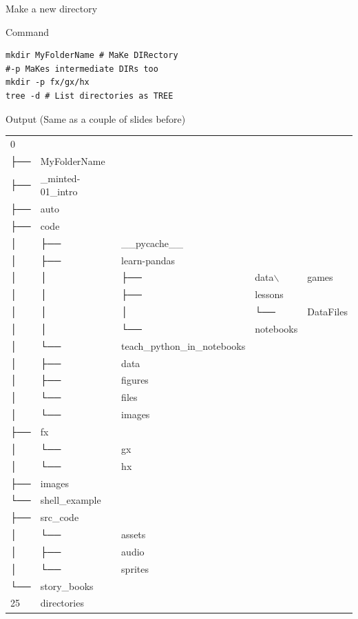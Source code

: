\documentclass[presentation]{beamer}
\begin{document}
\begin{frame}[label={sec:orgda3c18e},fragile]{Make a new directory}
 \begin{block}{Command}
\begin{verbatim}
mkdir MyFolderName # MaKe DIRectory
#-p MaKes intermediate DIRs too
mkdir -p fx/gx/hx
tree -d # List directories as TREE
\end{verbatim}
\end{block}

\alert{Output} (Same as a couple of slides before)
\tiny
\begin{center}
\begin{tabular}{lllll}
\toprule
0 &  &  &  & \\
├── & MyFolderName &  &  & \\
├── & \_minted-01\_intro &  &  & \\
├── & auto &  &  & \\
├── & code &  &  & \\
│   & ├── & \_\_pycache\_\_ &  & \\
│   & ├── & learn-pandas &  & \\
│   & │   & ├── & data$\backslash$ & games\\
│   & │   & ├── & lessons & \\
│   & │   & │   & └── & DataFiles\\
│   & │   & └── & notebooks & \\
│   & └── & teach\_python\_in\_notebooks &  & \\
│   & ├── & data &  & \\
│   & ├── & figures &  & \\
│   & └── & files &  & \\
│   & └── & images &  & \\
├── & fx &  &  & \\
│   & └── & gx &  & \\
│   & └── & hx &  & \\
├── & images &  &  & \\
└── & shell\_example &  &  & \\
├── & src\_code &  &  & \\
│   & └── & assets &  & \\
│   & ├── & audio &  & \\
│   & └── & sprites &  & \\
└── & story\_books &  &  & \\
25 & directories &  &  & \\
\bottomrule
\end{tabular}
\end{center}
\end{frame}
\end{document}
